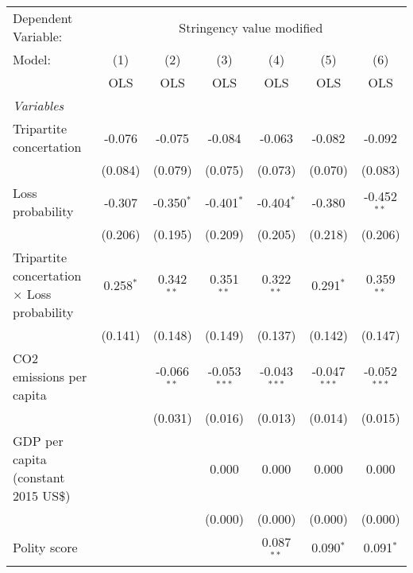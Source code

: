 
\begingroup
\centering
\begin{tabular}{lcccccc}
   \toprule
   Dependent Variable: & \multicolumn{6}{c}{Stringency value modified}\\
   Model:                                             & (1)         & (2)           & (3)            & (4)            & (5)            & (6)\\  
                                                      &  OLS        & OLS           & OLS            & OLS            & OLS            & OLS\\  
   \midrule
   \emph{Variables}\\
   Tripartite concertation                            & -0.076      & -0.075        & -0.084         & -0.063         & -0.082         & -0.092\\   
                                                      & (0.084)     & (0.079)       & (0.075)        & (0.073)        & (0.070)        & (0.083)\\   
   Loss probability                                   & -0.307      & -0.350$^{*}$  & -0.401$^{*}$   & -0.404$^{*}$   & -0.380         & -0.452$^{**}$\\   
                                                      & (0.206)     & (0.195)       & (0.209)        & (0.205)        & (0.218)        & (0.206)\\   
   Tripartite concertation $\times$ Loss probability  & 0.258$^{*}$ & 0.342$^{**}$  & 0.351$^{**}$   & 0.322$^{**}$   & 0.291$^{*}$    & 0.359$^{**}$\\   
                                                      & (0.141)     & (0.148)       & (0.149)        & (0.137)        & (0.142)        & (0.147)\\   
   CO2 emissions per capita                           &             & -0.066$^{**}$ & -0.053$^{***}$ & -0.043$^{***}$ & -0.047$^{***}$ & -0.052$^{***}$\\   
                                                      &             & (0.031)       & (0.016)        & (0.013)        & (0.014)        & (0.015)\\   
   GDP per capita (constant 2015 US\$)                &             &               & 0.000          & 0.000          & 0.000          & 0.000\\   
                                                      &             &               & (0.000)        & (0.000)        & (0.000)        & (0.000)\\   
   Polity score                                       &             &               &                & 0.087$^{**}$   & 0.090$^{*}$    & 0.091$^{*}$\\   

\end{tabular}
